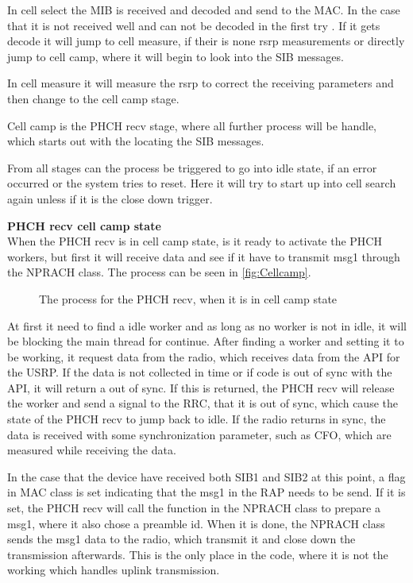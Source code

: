 In cell select the MIB is received and decoded and send to the MAC. In the case that it is not received well and can not be decoded in the first try . If it gets decode it will jump to cell measure, if their is none rsrp measurements  or directly jump to cell camp, where it will begin to look into the SIB messages.

In cell measure it will measure the rsrp to correct the receiving parameters and then change to the cell camp stage.

Cell camp is the PHCH recv stage, where all further process will be handle, which starts out with the locating the SIB messages.

From all stages can the process be triggered to go into idle state, if an error occurred or the system tries to reset. Here it will try to start up into cell search again unless if it is the close down trigger.

\textbf{PHCH recv cell camp state} \\
When the PHCH recv is in cell camp state, is it ready to activate the PHCH workers, but first it will receive data and see if it have to transmit msg1 through the NPRACH class. The process can be seen in \autoref{fig:Cellcamp}.

\begin{figure}[H]
\centering
{}
\resizebox{0.7\textwidth}{!}{
}
\caption{The process for the PHCH recv, when it is in cell camp state}
\label{fig:Cellcamp}
\end{figure}

At first it need to find a idle worker and as long as no worker is not in idle, it will be blocking the main thread for continue. After finding a worker and setting it to be working, it request data from the radio, which receives data from the API for the USRP. If the data is not collected in time or if code is out of sync with the API, it will return a out of sync. If this is returned, the PHCH recv will release the worker and send a signal to the RRC, that it is out of sync, which cause the state of the PHCH recv to jump back to idle. If the radio returns in sync, the data is received with some synchronization parameter, such as \gls{CFO}, which are measured while receiving the data.

In the case that the device have received both SIB1 and SIB2 at this point, a flag in MAC class is set indicating that the msg1 in the \gls{RAP} needs to be send. If it is set, the PHCH recv will call the function in the NPRACH class to prepare a msg1, where it also chose a preamble id. When it is done, the NPRACH class sends the msg1 data to the radio, which transmit it and close down the transmission afterwards. This is the only place in the code, where it is not the working which handles uplink transmission.

